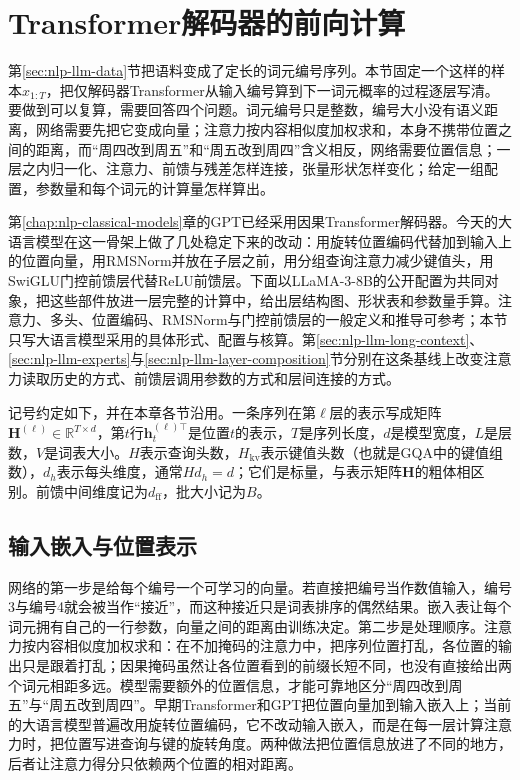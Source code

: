 \section{Transformer解码器的前向计算}
\label{sec:nlp-llm-computation}

第\ref{sec:nlp-llm-data}节把语料变成了定长的词元编号序列。本节固定一个这样的样本$x_{1:T}$，把仅解码器Transformer从输入编号算到下一词元概率的过程逐层写清。要做到可以复算，需要回答四个问题。词元编号只是整数，编号大小没有语义距离，网络需要先把它变成向量；注意力按内容相似度加权求和，本身不携带位置之间的距离，而“周四改到周五”和“周五改到周四”含义相反，网络需要位置信息；一层之内归一化、注意力、前馈与残差怎样连接，张量形状怎样变化；给定一组配置，参数量和每个词元的计算量怎样算出。

第\ref{chap:nlp-classical-models}章的GPT已经采用因果Transformer解码器。今天的大语言模型在这一骨架上做了几处稳定下来的改动：用旋转位置编码代替加到输入上的位置向量，用RMSNorm并放在子层之前，用分组查询注意力减少键值头，用SwiGLU门控前馈层代替ReLU前馈层。下面以LLaMA-3-8B的公开配置为共同对象，把这些部件放进一层完整的计算中，给出层结构图、形状表和参数量手算。注意力、多头、位置编码、RMSNorm与门控前馈层的一般定义和推导可参考；本节只写大语言模型采用的具体形式、配置与核算。第\ref{sec:nlp-llm-long-context}、\ref{sec:nlp-llm-experts}与\ref{sec:nlp-llm-layer-composition}节分别在这条基线上改变注意力读取历史的方式、前馈层调用参数的方式和层间连接的方式。

记号约定如下，并在本章各节沿用。一条序列在第$\ell$层的表示写成矩阵$\bm H^{(\ell)}\in\mathbb R^{T\times d}$，第$t$行$\bm h_t^{(\ell)\top}$是位置$t$的表示，$T$是序列长度，$d$是模型宽度，$L$是层数，$V$是词表大小。$H$表示查询头数，$H_{\mathrm{kv}}$表示键值头数（也就是GQA中的键值组数），$d_h$表示每头维度，通常$Hd_h=d$；它们是标量，与表示矩阵$\bm H$的粗体相区别。前馈中间维度记为$d_{\mathrm{ff}}$，批大小记为$B$。

\subsection{输入嵌入与位置表示}
\label{sec:nlp-llm-embedding}

网络的第一步是给每个编号一个可学习的向量。若直接把编号当作数值输入，编号3与编号4就会被当作“接近”，而这种接近只是词表排序的偶然结果。嵌入表让每个词元拥有自己的一行参数，向量之间的距离由训练决定。第二步是处理顺序。注意力按内容相似度加权求和：在不加掩码的注意力中，把序列位置打乱，各位置的输出只是跟着打乱；因果掩码虽然让各位置看到的前缀长短不同，也没有直接给出两个词元相距多远。模型需要额外的位置信息，才能可靠地区分“周四改到周五”与“周五改到周四”。早期Transformer和GPT把位置向量加到输入嵌入上；当前的大语言模型普遍改用旋转位置编码，它不改动输入嵌入，而是在每一层计算注意力时，把位置写进查询与键的旋转角度。两种做法把位置信息放进了不同的地方，后者让注意力得分只依赖两个位置的相对距离。


